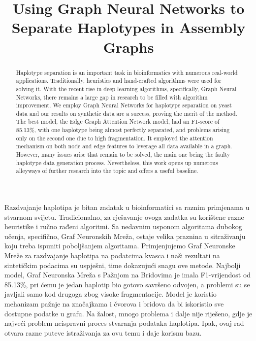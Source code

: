 \documentclass[times, utf8, diplomski, english]{fer_eng}
\begin{document}
\title{Using Graph Neural Networks to Separate Haplotypes in Assembly Graphs}
\begin{abstract}
	
Haplotype separation is an important task in bioinformatics with numerous real-world applications. Traditionally, heuristics and hand-crafted algorithms were used for solving it. With the recent rise in deep learning algorithms, specifically, Graph Neural Networks, there remains a large gap in research to be filled with algorithm improvement. We employ Graph Neural Networks for haplotype separation on yeast data and our results on synthetic data are a success, proving the merit of the method. The best model, the Edge Graph Attention Network model, had an F1-score of 85.13\%, with one haplotype being almost perfectly separated, and problems arising only on the second one due to high fragmentation. It employed the attention mechanism on both node and edge features to leverage all data available in a graph. However, many issues arise that remain to be solved, the main one being the faulty haplotype data generation process. Nevertheless, this work opens up numerous alleyways of further research into the topic and offers a useful baseline.

\end{abstract}

\begin{sazetak}
	
Razdvajanje haplotipa je bitan zadatak u bioinformatici sa raznim primjenama u stvarnom svijetu. Tradicionalno, za rješavanje ovoga zadatka su korištene razne heuristike i ručno rađeni algoritmi. Sa nedavnim usponom algoritama dubokog učenja, specifično, Graf Neuronskih Mreža, ostaje velika praznina u sitraživanju koju treba ispuniti poboljšanjem algoritama. Primjenjujemo Graf Neuronske Mreže za razdvajanje haplotipa na podatcima kvasca i naši rezultati na sintetičkim podacima su uspješni, time dokazujući snagu ove metode. Najbolji model, Graf Neuronska Mreža s Pažnjom na Bridovima je imala F1-vrijendost od 85.13\%, pri ćemu je jedan haplotip bio gotovo savršeno odvojen, a problemi su se javljali samo kod drugoga zbog visoke fragmentacije. Model je koristio mehanizam pažnje na značajkama i čvorova i bridova da bi iskoristio sve dostupne podatke u grafu. Na žalost, mnogo problema i dalje nije riješeno, gdje je najveći problem neispravni proces stvaranja podataka haplotipa. Ipak, ovaj rad otvara razne puteve istraživanja za ovu temu i daje korisnu bazu.

\end{sazetak}
\end{document}
